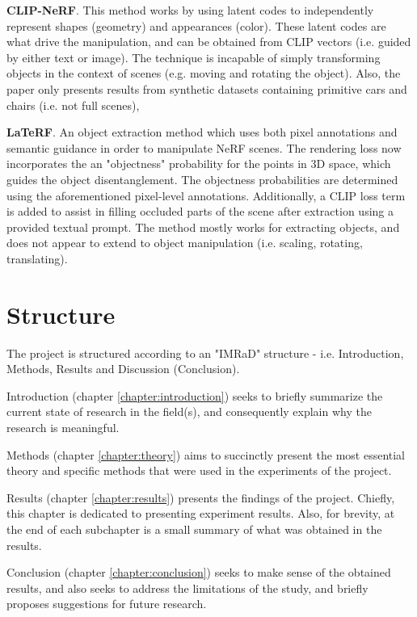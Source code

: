 \textbf{CLIP-NeRF}\cite{clip-nerf}. This method works by using latent codes to independently represent shapes (geometry) and appearances (color). These latent codes are what drive the manipulation, and can be obtained from CLIP vectors (i.e. guided by either text or image). The technique is incapable of simply transforming objects in the context of scenes (e.g. moving and rotating the object). Also, the paper only presents results from synthetic datasets containing primitive cars and chairs (i.e. not full scenes),  

\textbf{LaTeRF}\cite{laterf}. An object extraction method which uses both pixel annotations and semantic guidance in order to manipulate NeRF scenes. The rendering loss now incorporates the an "objectness" probability for the points in 3D space, which guides the object disentanglement. The objectness probabilities are determined using the aforementioned pixel-level annotations. Additionally, a CLIP loss term is added to assist in filling occluded parts of the scene after extraction using a provided textual prompt. The method mostly works for extracting objects, and does not appear to extend to object manipulation (i.e. scaling, rotating, translating).

\section{Structure}
The project is structured according to an "IMRaD" structure - i.e. Introduction, Methods, Results and Discussion (Conclusion).

Introduction (chapter \ref{chapter:introduction}) seeks to briefly summarize the current state of research in the field(s), and consequently explain why the research is meaningful.

Methods (chapter \ref{chapter:theory}) aims to succinctly present the most essential theory and specific methods that were used in the experiments of the project.

Results (chapter \ref{chapter:results}) presents the findings of the project. Chiefly, this chapter is dedicated to presenting experiment results. Also, for brevity, at the end of each subchapter is a small summary of what was obtained in the results.

Conclusion (chapter \ref{chapter:conclusion}) seeks to make sense of the obtained results, and also seeks to address the limitations of the study, and briefly proposes suggestions for future research.
